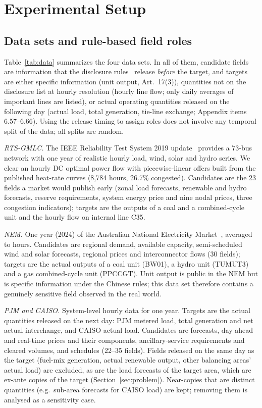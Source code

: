 \section{Experimental Setup}\label{sec:setup}

\subsection{Data sets and rule-based field roles}\label{sec:data}
Table~\ref{tab:data} summarizes the four data sets. In all of them, candidate fields are
information that the disclosure rules~\cite{nea2024disclosure} release \emph{before} the
target, and targets are either specific information (unit output, Art.~17(3)), quantities not on
the disclosure list at hourly resolution (hourly line flow; only daily averages of important
lines are listed), or actual operating quantities released on the following day (actual load,
total generation, tie-line exchange; Appendix items 6.57--6.66). Using the release timing to
assign roles does not involve any temporal split of the data; all splits are random.

\emph{RTS-GMLC.} The IEEE Reliability Test System 2019 update~\cite{barrows2020rts} provides a
73-bus network with one year of realistic hourly load, wind, solar and hydro series. We clear
an hourly DC optimal power flow with piecewise-linear offers built from the published heat-rate
curves (8,784 hours, 26.7\% congested). Candidates are the 23 fields a market would publish
early (zonal load forecasts, renewable and hydro forecasts, reserve requirements, system energy
price and nine nodal prices, three congestion indicators); targets are the outputs of a coal and
a combined-cycle unit and the hourly flow on internal line C35.

\emph{NEM.} One year (2024) of the Australian National Electricity Market~\cite{aemo2024nemweb},
averaged to hours. Candidates are regional demand, available capacity, semi-scheduled wind and
solar forecasts, regional prices and interconnector flows (30 fields); targets are the actual
outputs of a coal unit (BW01), a hydro unit (TUMUT3) and a gas combined-cycle unit (PPCCGT).
Unit output is public in the NEM but is specific information under the Chinese rules; this data
set therefore contains a genuinely sensitive field observed in the real world.

\emph{PJM and CAISO.} System-level hourly data for one year. Targets are the actual quantities
released on the next day: PJM metered load, total generation and net actual interchange, and
CAISO actual load. Candidates are forecasts, day-ahead and real-time prices and their
components, ancillary-service requirements and cleared volumes, and schedules (22--35 fields).
Fields released on the same day as the target (fuel-mix generation, actual renewable output,
other balancing areas' actual load) are excluded, as are the load forecasts of the target area,
which are ex-ante copies of the target (Section~\ref{sec:problem}). Near-copies that are distinct
quantities (e.g.\ sub-area forecasts for CAISO load) are kept; removing them is analysed as a
sensitivity case.

